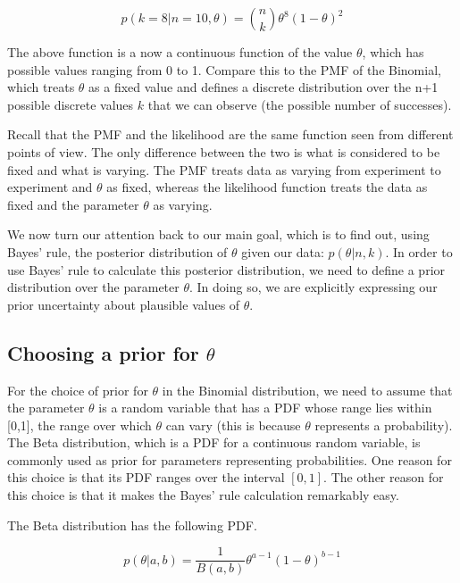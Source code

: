 \documentclass[12pt,]{krantz}
\theoremstyle{definition}
\theoremstyle{definition}
\theoremstyle{definition}
\theoremstyle{remark}
\begin{document}
\begin{equation}
p(k=8 | n= 10, \theta) = \binom{n}{k} \theta^8 (1-\theta)^{2}
\end{equation}

The above function is a now a continuous function of the value
\(\theta\), which has possible values ranging from 0 to 1. Compare this
to the PMF of the Binomial, which treats \(\theta\) as a fixed value and
defines a discrete distribution over the n+1 possible discrete values
\(k\) that we can observe (the possible number of successes).

Recall that the PMF and the likelihood are the same function seen from
different points of view. The only difference between the two is what is
considered to be fixed and what is varying. The PMF treats data as
varying from experiment to experiment and \(\theta\) as fixed, whereas
the likelihood function treats the data as fixed and the parameter
\(\theta\) as varying.

We now turn our attention back to our main goal, which is to find out,
using Bayes' rule, the posterior distribution of \(\theta\) given our
data: \(p(\theta|n,k)\). In order to use Bayes' rule to calculate this
posterior distribution, we need to define a prior distribution over the
parameter \(\theta\). In doing so, we are explicitly expressing our
prior uncertainty about plausible values of \(\theta\).

\subsection{\texorpdfstring{Choosing a prior for
\(\theta\)}{Choosing a prior for \textbackslash{}theta}}\label{choosing-a-prior-for-theta}

For the choice of prior for \(\theta\) in the Binomial distribution, we
need to assume that the parameter \(\theta\) is a random variable that
has a PDF whose range lies within {[}0,1{]}, the range over which
\(\theta\) can vary (this is because \(\theta\) represents a
probability). The Beta distribution, which is a PDF for a continuous
random variable, is commonly used as prior for parameters representing
probabilities. One reason for this choice is that its PDF ranges over
the interval \([0,1]\). The other reason for this choice is that it
makes the Bayes' rule calculation remarkably easy.

The Beta distribution has the following PDF.

\begin{equation}
p(\theta|a,b)=  \frac{1}{B(a,b)} \theta^{a - 1} (1-\theta)^{b-1}   
\label{eq:beta}
\end{equation}
\end{document}
